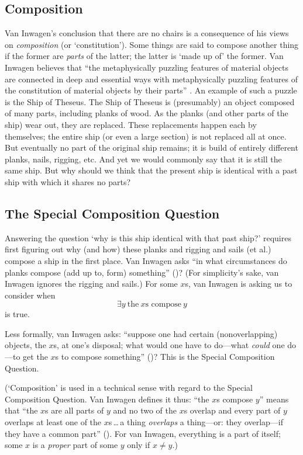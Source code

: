 \documentclass[11pt]{article}
\begin{document}
\begin{spacing}{1.5}
\subsection{Composition}
\label{comp}
Van Inwagen's conclusion that there are no chairs is a consequence of
his views on {\em composition} (or `constitution').  Some things are
said to compose another thing if the former are {\em parts} of the
latter; the latter is `made up of' the former.  Van Inwagen believes
that ``the metaphysically puzzling features of material objects are
connected in deep and essential ways with metaphysically puzzling
features of the constitution of material objects by their
parts'' \citep[18]{inwagen1995}.  An example of such a puzzle is the
Ship of Theseus.  The Ship of Theseus is (presumably) an object
composed of many parts, including planks of wood.  As the planks (and
other parts of the ship) wear out, they are replaced.  These
replacements happen each by themselves; the entire ship (or even a
large section) is not replaced all at once.  But eventually no part of
the original ship remains; it is build of entirely different planks,
nails, rigging, etc.  And yet we would commonly say that it is still
the same ship.  But why should we think that the present ship is
identical with a past ship with which it shares no parts?

\subsection{The Special Composition Question}
\label{scq}
Answering the question `why is this ship identical with that past
ship?' requires first figuring out why (and how) these planks and
rigging and sails (et al.) compose a ship in the first place.  Van
Inwagen asks ``in what circumstances do planks compose (add up to,
form) something'' (\citeyear[21]{inwagen1995})?  (For simplicity's
sake, van Inwagen ignores the rigging and sails.)  For some $x$s, van
Inwagen is asking us to consider when
\begin{displaymath}
\exists y\ \text{the}\ x\text{s compose}\ y
\end{displaymath}
is true.

Less formally, van Inwagen asks: ``suppose one had certain
(nonoverlapping) objects, the $x$s, at one's disposal; what would one
have to do---what {\em could} one do---to get the $x$s to compose
something'' (\citeyear[31]{inwagen1995})?  This is the Special
Composition Question.

(`Composition' is used in a technical sense with regard to the Special
Composition Question.  Van Inwagen defines it thus: ``the $x$s compose
$y$'' means that ``the $x$s are all parts of $y$ and no two of the
$x$s overlap and every part of $y$ overlaps at least one of the
$x$s\,\ldots\,a thing {\em overlaps} a thing---or: they overlap---if
they have a common part'' (\citeyear[29]{inwagen1995}).  For van
Inwagen, everything is a part of itself; some $x$ is a {\em proper}
part of some $y$ only if $x \neq y$.)


\end{spacing}
\end{document}
